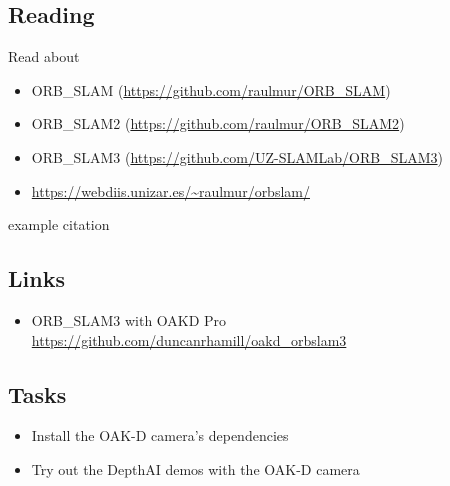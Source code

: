 \documentclass{article}
\begin{document}
\subsection{Reading}
Read about 
\begin{itemize}
    \item ORB\_SLAM (\url{https://github.com/raulmur/ORB_SLAM}) 
    \item ORB\_SLAM2 (\url{https://github.com/raulmur/ORB_SLAM2})
    \item ORB\_SLAM3 (\url{https://github.com/UZ-SLAMLab/ORB_SLAM3}) 
    \item \url{https://webdiis.unizar.es/~raulmur/orbslam/} 
\end{itemize}


example citation \cite{Macenski2021}


\subsection{Links}
\begin{itemize}
\item ORB\_SLAM3 with OAKD Pro \url{https://github.com/duncanrhamill/oakd_orbslam3}
\end{itemize}

\subsection{Tasks}
\begin{itemize}
    \item Install the OAK-D camera's dependencies 
    \item Try out the DepthAI demos with the OAK-D camera 
\end{itemize}

\newpage
\end{document}
